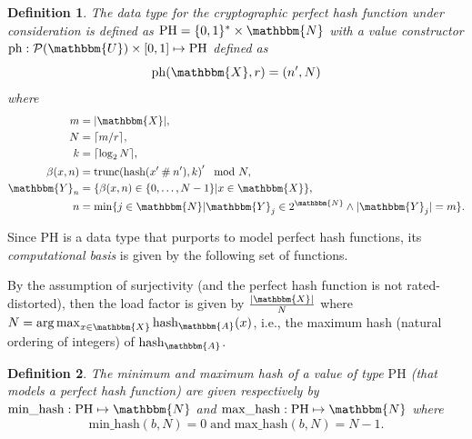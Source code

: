\documentclass[hidelinks,11pt,final]{article}
\newcommand{\envnumstyle}{section}
\theoremstyle{plain}
\newtheorem{definition}{Definition}[\envnumstyle]
\newcommand{\cat}{\mathbin{\#}}
\newcommand{\Fun}[2][]{\mathrm{#2}_{#1}}
\newcommand{\PH}{\mathrm{PH}}
\newcommand{\ph}{\mathrm{ph}}
\newcommand{\PS}[1]{\mathcal{P}(#1)}
\DeclareMathOperator*{\argmax}{arg\,max}
\newcommand{\MinHash}{\mathrm{min\_hash}}
\newcommand{\MaxHash}{\mathrm{max\_hash}}
\begin{document}
\begin{definition}
The \emph{data type} for the \emph{cryptographic} perfect hash function under consideration is defined as $\PH = \{0,1\}^* \times \mathbbm{N}$ with a value constructor $\ph : \PS{\mathbbm{U}} \times [0,1] \mapsto \PH$ defined as
\begin{equation}
	\mathrm{ph}(\mathbbm{X}, r) = (n',N)
\end{equation}
where
\begin{equation}
\begin{split}
m			&= |\mathbbm{X}|,\\
N 			&= \lceil m / r \rceil,\\
k			&= \lceil\log_2 N\rceil,\\
\beta(x,n) 	&= \mathrm{trunc}\!\left(\mathrm{hash}(x' \cat n'),k\right)' \mod N,\\
\mathbbm{Y}_n 	&= \{\beta(x,n) \in \{0,\ldots,N-1\}|x \in \mathbbm{X}\},\\
n 			& = \min\{ j \in \mathbbm{N} | \mathbbm{Y}_j \in 2^{\mathbbm{N}} \land |\mathbbm{Y}_j| = m\}.
\end{split}
\end{equation}
\end{definition}


Since $\PH$ is a data type that purports to model perfect hash functions, its \emph{computational basis} is given by the following set of functions.

By the assumption of surjectivity (and the perfect hash function is not rated-distorted), then the load factor is given by $\frac{|\mathbbm{X}|}{N}$ where $N = \argmax_{x \in \mathbbm{X}} \mathrm{hash}_{\mathbbm{A}}(x)$, i.e., the maximum hash (natural ordering of integers) of $\mathrm{hash}_{\mathbbm{A}}$.
\begin{definition}
The \emph{minimum} and \emph{maximum} hash of a value of type $\PH$ (that models a perfect hash function) are given respectively by $\MinHash : \PH \mapsto \mathbbm{N}$ and $\MaxHash : \PH \mapsto \mathbbm{N}$ where
\begin{equation}
	\mathrm{min\_hash}(b,N) = 0\;\text{and}\;\mathrm{max\_hash}(b,N) = N-1.
\end{equation}
\end{definition}
\end{document}
